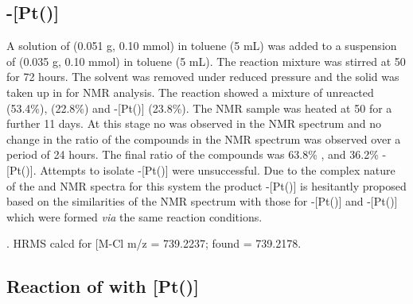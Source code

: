 \subsection*{\trans{}-[Pt(\tBusixantphos)]}

A solution of \tBusixantphos{} (0.051 g, 0.10 mmol) in toluene (5 mL) was added to a suspension of \ce{[Pt(C6H10)Cl2]} (0.035 g, 0.10 mmol) in toluene (5 mL).  The reaction mixture was stirred at 50 \degC{} for 72 hours.  The solvent was removed under reduced pressure and the solid was taken up in  for NMR analysis.  The reaction showed a mixture of unreacted \tBusixantphos{} (53.4\%), \tBusixantphos {} (22.8\%) and \trans-[Pt(\tBusixantphos)] (23.8\%).  The NMR sample was heated at 50 \degC{} for a further 11 days.  At this stage no \ce{[Pt(C6H10)Cl2]} was observed in the \proton{} NMR spectrum and no change in the ratio of the compounds in the \phosphorus{} NMR spectrum was observed over a period of 24 hours.  The final ratio of the compounds was 63.8\% \tBusixantphos {}, and 36.2\% \trans-[Pt(\tBusixantphos)].  Attempts to isolate \trans-[Pt(\tBusixantphos)] were unsuccessful.  Due to the complex nature of the \proton{} and \carbon{} NMR spectra for this system the product \trans-[Pt(\tBusixantphos)] is hesitantly proposed based on the similarities of the \phosphorus{} NMR spectrum with those for \trans-[Pt(\tButhixantphos)] and \trans-[Pt(\tBuxantphos)] which were formed \emph{via} the same reaction conditions. 

.
HRMS calcd for  [M-Cl\ce{]+} m/z = 739.2237; found = 739.2178.

\subsection*{Reaction of \tBuxantphos{} with [Pt()]}


